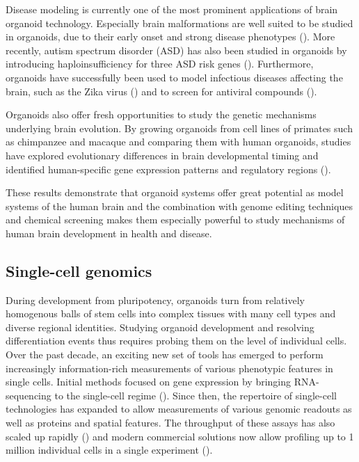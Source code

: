 Disease modeling is currently one of the most prominent applications of brain organoid technology. Especially brain malformations are well suited to be studied in organoids, due to their early onset and strong disease phenotypes (\cite{klaus_altered_2019,lancaster_cerebral_2013}). More recently, autism spectrum disorder (ASD) has also been studied in organoids by introducing haploinsufficiency for three ASD risk genes (\cite{paulsen_autism_2022}). Furthermore, organoids have successfully been used to model infectious diseases affecting the brain, such as the Zika virus (\cite{qian_brain-region-specific_2016,dang_zika_2016}) and to screen for antiviral compounds (\cite{zhou_high-content_2017}). 

Organoids also offer fresh opportunities to study the genetic mechanisms underlying brain evolution. By growing organoids from cell lines of primates such as chimpanzee and macaque and comparing them with human organoids, studies have explored evolutionary differences in brain developmental timing and identified human-specific gene expression patterns and regulatory regions (\cite{kanton_organoid_2019,mora-bermudez_differences_2016,pollen_establishing_2019}).

These results demonstrate that organoid systems offer great potential as model systems of the human brain and the combination with genome editing techniques and chemical screening makes them especially powerful to study mechanisms of human brain development in health and disease.


\subsection{Single-cell genomics}


During development from pluripotency, organoids turn from relatively homogenous balls of stem cells into complex tissues with many cell types and diverse regional identities. Studying organoid development and resolving differentiation events thus requires probing them on the level of individual cells. Over the past decade, an exciting new set of tools has emerged to perform increasingly information-rich measurements of various phenotypic features in single cells. Initial methods focused on gene expression by bringing RNA-sequencing to the single-cell regime (\cite{tang_mrna-seq_2009,islam_characterization_2011}). Since then, the repertoire of single-cell technologies has expanded to allow measurements of various genomic readouts as well as proteins and spatial features. The throughput of these assays has also scaled up rapidly (\cite{svensson_exponential_2018}) and modern commercial solutions now allow profiling up to 1 million individual cells in a single experiment (\cite{srivatsan_massively_2020,mulqueen_high-content_2021}). 

